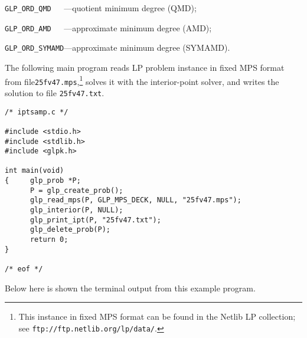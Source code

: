 \verb|GLP_ORD_QMD   |---quotient minimum degree (QMD);

\verb|GLP_ORD_AMD   |---approximate minimum degree (AMD);

\verb|GLP_ORD_SYMAMD|---approximate minimum degree (SYMAMD).

\bigskip


The following main program reads LP problem instance in fixed MPS
format from file\linebreak \verb|25fv47.mps|,\footnote{This instance in
fixed MPS format can be found in the Netlib LP collection; see
{\tt ftp://ftp.netlib.org/lp/data/}.} solves it with the interior-point
solver, and writes the solution to file \verb|25fv47.txt|.

\begin{footnotesize}
\begin{verbatim}
/* iptsamp.c */

#include <stdio.h>
#include <stdlib.h>
#include <glpk.h>

int main(void)
{     glp_prob *P;
      P = glp_create_prob();
      glp_read_mps(P, GLP_MPS_DECK, NULL, "25fv47.mps");
      glp_interior(P, NULL);
      glp_print_ipt(P, "25fv47.txt");
      glp_delete_prob(P);
      return 0;
}

/* eof */
\end{verbatim}
\end{footnotesize}

\newpage

Below here is shown the terminal output from this example program.

